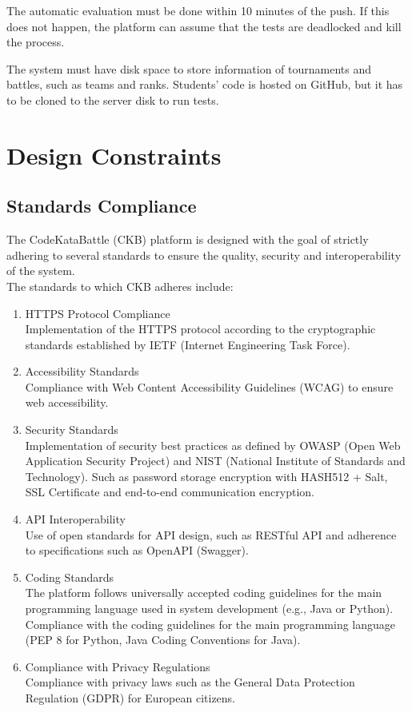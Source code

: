 The automatic evaluation must be done within 10 minutes of the push.
If this does not happen, the platform can assume that the tests are deadlocked and kill the process.

The system must have disk space to store information of tournaments and battles, such as teams and ranks.
Students' code is hosted on GitHub, but it has to be cloned to the server disk to run tests.

\section{Design Constraints}
\subsection{Standards Compliance}
The CodeKataBattle (CKB) platform is designed with the goal of strictly adhering to several standards to ensure the quality, security and interoperability of the system.\\ The standards to which CKB adheres include:

\begin{enumerate}
      \item HTTPS Protocol Compliance\\
            Implementation of the HTTPS protocol according to the cryptographic standards established by IETF (Internet Engineering Task Force).

      \item Accessibility Standards\\
            Compliance with Web Content Accessibility Guidelines (WCAG) to ensure web accessibility.

      \item Security Standards\\
            Implementation of security best practices as defined by OWASP (Open Web Application Security Project) and NIST (National Institute of Standards and Technology).
            Such as password storage encryption with HASH512 + Salt, SSL Certificate and end-to-end communication encryption.


      \item API Interoperability\\
            Use of open standards for API design, such as RESTful API and adherence to specifications such as OpenAPI (Swagger).


      \item Coding Standards\\
            The platform follows universally accepted coding guidelines for the main programming language used in system development (e.g., Java or Python).
            Compliance with the coding guidelines for the main programming language (PEP 8 for Python, Java Coding Conventions for Java).


      \item Compliance with Privacy Regulations\\
            Compliance with privacy laws such as the General Data Protection Regulation (GDPR) for European citizens.
\end{enumerate}


